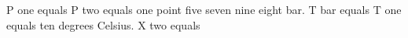 P one equals P two equals one point five seven nine eight bar. T bar equals T one equals ten degrees Celsius. X two equals
